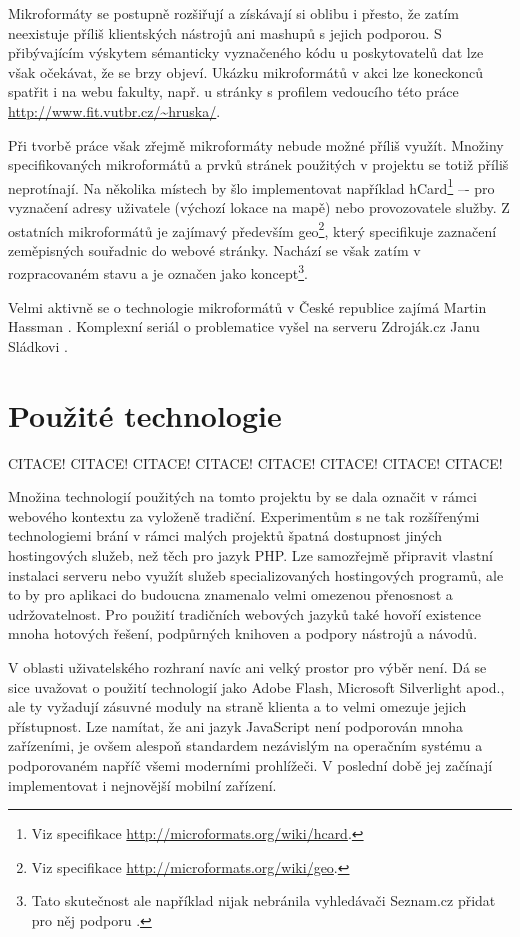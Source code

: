 Mikroformáty se postupně rozšiřují a získávají si oblibu i přesto, že
zatím neexistuje příliš klientských nástrojů ani mashupů s jejich
podporou. S přibývajícím výskytem sémanticky vyznačeného kódu u
poskytovatelů dat lze však očekávat, že se brzy objeví. Ukázku
mikroformátů v akci lze koneckonců spatřit i na webu
fakulty, např. u stránky s profilem vedoucího této práce
\url{http://www.fit.vutbr.cz/~hruska/}.

Při tvorbě práce však zřejmě mikroformáty nebude možné příliš využít.
Množiny specifikovaných mikroformátů a prvků stránek použitých v
projektu se totiž příliš neprotínají. Na několika místech by šlo
implementovat například
hCard\footnote{Viz
specifikace \url{http://microformats.org/wiki/hcard}.} –- pro
vyznačení adresy uživatele (výchozí lokace na mapě) nebo provozovatele služby. Z ostatních mikroformátů je zajímavý především
geo\footnote{Viz specifikace \url{http://microformats.org/wiki/geo}.},
který specifikuje zaznačení zeměpisných souřadnic do webové stránky.
Nachází se však zatím v rozpracovaném stavu a je označen jako
koncept\footnote{Tato skutečnost ale například nijak nebránila vyhledávači Seznam.cz
přidat pro něj podporu \cite{geoSeznam}.}.

Velmi aktivně se o technologie mikroformátů v České republice zajímá
Martin Hassman \cite{mfLupa}. Komplexní seriál o problematice vyšel
na serveru Zdroják.cz Janu Sládkovi \cite{mf}.

\chapter{Použité technologie}
CITACE! CITACE! CITACE! CITACE! CITACE! CITACE! CITACE! CITACE!

Množina technologií použitých na tomto projektu by se dala označit v
rámci webového kontextu za vyloženě tradiční. Experimentům s ne tak
rozšířenými technologiemi brání v rámci malých projektů špatná
dostupnost jiných hostingových služeb, než těch pro jazyk PHP. Lze samozřejmě
připravit vlastní instalaci serveru nebo využít služeb
specializovaných hostingových programů, ale to by pro aplikaci do
budoucna znamenalo velmi omezenou přenosnost a udržovatelnost. Pro
použití tradičních webových jazyků také hovoří existence mnoha
hotových řešení, podpůrných knihoven a podpory nástrojů a návodů.

V oblasti uživatelského rozhraní navíc ani velký prostor pro výběr
není. Dá se sice uvažovat o použití technologií jako Adobe Flash, Microsoft
Silverlight apod., ale ty vyžadují zásuvné moduly na straně klienta
a to velmi omezuje jejich přístupnost. Lze namítat, že ani jazyk
JavaScript není podporován mnoha zařízeními, je ovšem alespoň
standardem nezávislým na operačním systému a podporovaném napříč všemi
moderními prohlížeči. V poslední době jej začínají implementovat i
nejnovější mobilní zařízení.

